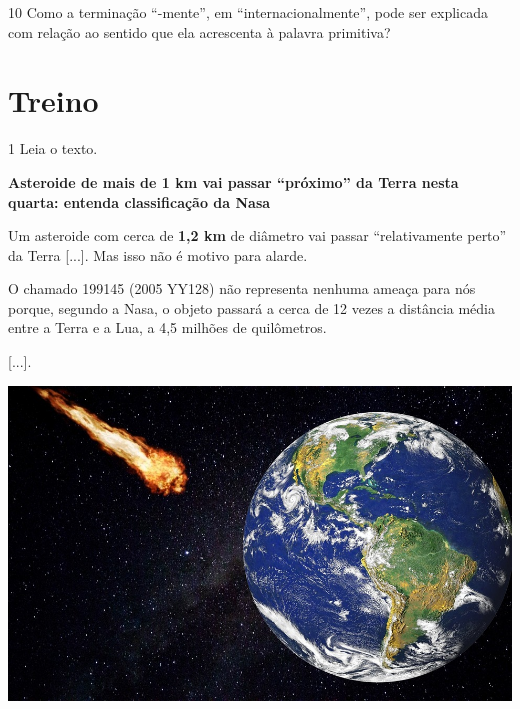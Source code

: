 \num{10} Como a terminação “-mente”, em “internacionalmente”, pode ser explicada com relação ao sentido que ela acrescenta à palavra primitiva?


\section*{Treino}

\num{1} Leia o texto.\medskip

\begin{myquote}
\textbf{Asteroide de mais de 1 km vai passar “próximo” da Terra nesta
quarta: entenda classificação da Nasa}

Um asteroide com cerca de \textbf{1,2 km} de diâmetro vai passar
“relativamente perto” da Terra {[}...{]}. Mas
isso não é motivo para alarde.

O chamado 199145 (2005 YY128) não representa nenhuma ameaça para nós
porque, segundo a Nasa, o
objeto passará a cerca de 12 vezes a distância média entre a Terra e a
Lua, a 4,5 milhões de quilômetros.

{[}...{]}.


\begin{center}
\includegraphics[width=.9\textwidth]{./imgs/img3.jpg}
\end{center}
\end{myquote}


